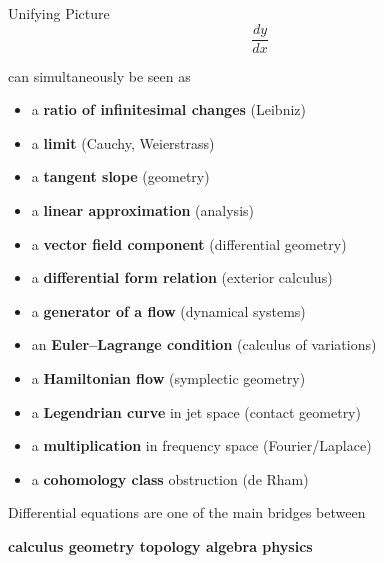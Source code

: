 \begin{frame}{Unifying Picture}
\[
\frac{dy}{dx}
\]

can simultaneously be seen as

\begin{itemize}
\item a \textbf{ratio of infinitesimal changes} (Leibniz)
\item a \textbf{limit} (Cauchy, Weierstrass)
\item a \textbf{tangent slope} (geometry)
\item a \textbf{linear approximation} (analysis)
\item a \textbf{vector field component} (differential geometry)
\item a \textbf{differential form relation} (exterior calculus)
\item a \textbf{generator of a flow} (dynamical systems)
\item an \textbf{Euler--Lagrange condition} (calculus of variations)
\item a \textbf{Hamiltonian flow} (symplectic geometry)
\item a \textbf{Legendrian curve} in jet space (contact geometry)
\item a \textbf{multiplication} in frequency space (Fourier/Laplace)
\item a \textbf{cohomology class} obstruction (de Rham)
\end{itemize}

\vspace{0.3cm}
Differential equations are one of the main bridges between
\begin{center}
\textbf{calculus \quad geometry \quad topology \quad algebra \quad physics}
\end{center}
\end{frame}
